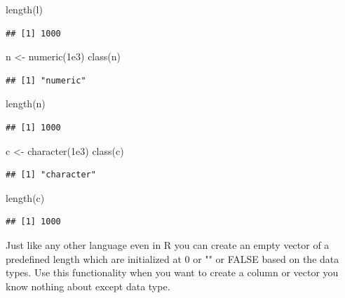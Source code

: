\documentclass[
]{book}
\newenvironment{Shaded}{\begin{snugshade}}{\end{snugshade}}
\newcommand{\FloatTok}[1]{\textcolor[rgb]{0.00,0.00,0.81}{#1}}
\newcommand{\FunctionTok}[1]{\textcolor[rgb]{0.00,0.00,0.00}{#1}}
\newcommand{\NormalTok}[1]{#1}
\newcommand{\OtherTok}[1]{\textcolor[rgb]{0.56,0.35,0.01}{#1}}
\begin{document}
\begin{Shaded}
\begin{Highlighting}[]
\FunctionTok{length}\NormalTok{(l)}
\end{Highlighting}
\end{Shaded}

\begin{verbatim}
## [1] 1000
\end{verbatim}

\begin{Shaded}
\begin{Highlighting}[]
\NormalTok{n }\OtherTok{\textless{}{-}} \FunctionTok{numeric}\NormalTok{(}\FloatTok{1e3}\NormalTok{)}
\FunctionTok{class}\NormalTok{(n)}
\end{Highlighting}
\end{Shaded}

\begin{verbatim}
## [1] "numeric"
\end{verbatim}

\begin{Shaded}
\begin{Highlighting}[]
\FunctionTok{length}\NormalTok{(n)}
\end{Highlighting}
\end{Shaded}

\begin{verbatim}
## [1] 1000
\end{verbatim}

\begin{Shaded}
\begin{Highlighting}[]
\NormalTok{c }\OtherTok{\textless{}{-}} \FunctionTok{character}\NormalTok{(}\FloatTok{1e3}\NormalTok{)}
\FunctionTok{class}\NormalTok{(c)}
\end{Highlighting}
\end{Shaded}

\begin{verbatim}
## [1] "character"
\end{verbatim}

\begin{Shaded}
\begin{Highlighting}[]
\FunctionTok{length}\NormalTok{(c)}
\end{Highlighting}
\end{Shaded}

\begin{verbatim}
## [1] 1000
\end{verbatim}

Just like any other language even in R you can create an empty vector of a predefined length which are initialized at 0 or "" or FALSE based on the data types. Use this functionality when you want to create a column or vector you know nothing about except data type.
\end{document}
